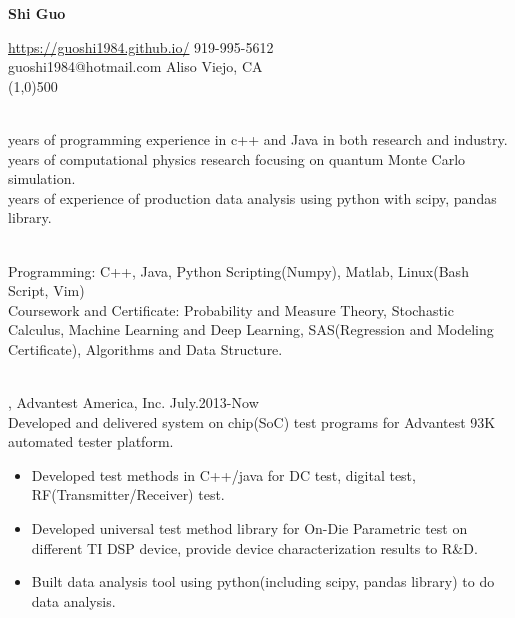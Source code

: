\documentclass[11pt]{article} %
\begin{document}
 \centerline{\Large \bf Shi Guo}
  \noindent \url{https://guoshi1984.github.io/} \hspace{80mm}  919-995-5612\\
    guoshi1984@hotmail.com \hspace{95mm}   Aliso Viejo, CA\\
\line(1,0){500}


\vspace{1mm}

\\
 years of programming experience in c++ and Java in both research and industry.  \\
 years of computational physics research focusing on quantum Monte Carlo simulation.\\
 years of experience of production data analysis using python with scipy, pandas library.  \\

\vspace{1mm}

\\
\noindent 
Programming: C++, Java, Python Scripting(Numpy), Matlab,  Linux(Bash Script, Vim) \\
Coursework and Certificate: Probability and Measure Theory, Stochastic Calculus,
 Machine Learning and Deep Learning, SAS(Regression and Modeling Certificate), Algorithms and Data Structure.  



\vspace{2mm}

\\
, Advantest America, Inc. July.2013-Now\\
\noindent Developed and delivered system on chip(SoC) test programs for Advantest 93K automated tester platform.\\ 
\begin{itemize}
  
    \item Developed test methods in C++/java for DC test, digital test, RF(Transmitter/Receiver) test.\\
 \vspace{-4mm}
    \item  Developed universal test method library for On-Die Parametric test on different TI DSP device, provide device characterization results to R\&D.\\ 
 
  \vspace{-4mm}
 \item  Built data analysis tool using python(including scipy, pandas library) to do data analysis.

  
 \end{itemize}
\end{document}
